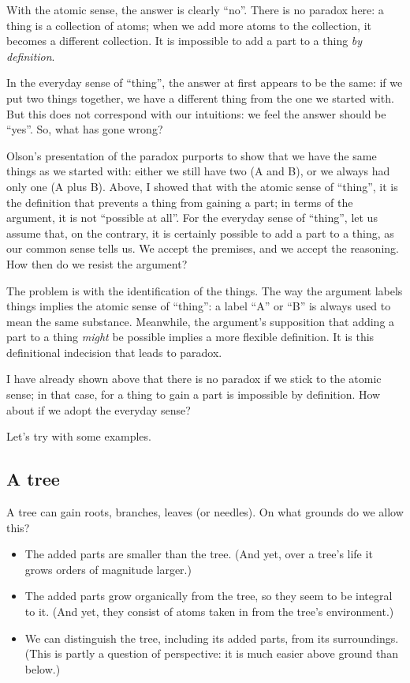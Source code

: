 \documentclass[english,a5paper]{scrartcl}
\begin{document}
With the atomic sense, the answer is clearly “no”. There is no paradox here: a thing is a collection of atoms; when we add more atoms to the collection, it becomes a different collection. It is impossible to add a part to a thing \emph{by definition}.

In the everyday sense of “thing”, the answer at first appears to be the same: if we put two things together, we have a different thing from the one we started with. But this does not correspond with our intuitions: we feel the answer should be “yes”. So, what has gone wrong?

Olson’s presentation of the paradox purports to show that we have the same things as we started with: either we still have two (A and B), or we always had only one (A plus B). Above, I showed that with the atomic sense of “thing”, it is the definition that prevents a thing from gaining a part; in terms of the argument, it is not “possible at all”. For the everyday sense of “thing”, let us assume that, on the contrary, it is certainly possible to add a part to a thing, as our common sense tells us. We accept the premises, and we accept the reasoning. How then do we resist the argument?

The problem is with the identification of the things. The way the argument labels things implies the atomic sense of “thing”: a label “A” or “B” is always used to mean the same substance. Meanwhile, the argument’s supposition that adding a part to a thing \emph{might} be possible implies a more flexible definition. It is this definitional indecision that leads to paradox.

I have already shown above that there is no paradox if we stick to the atomic sense; in that case, for a thing to gain a part is impossible by definition. How about if we adopt the everyday sense?

Let’s try with some examples.

\subsection{A tree}

A tree can gain roots, branches, leaves (or needles). On what grounds do we allow this?

\begin{itemize}
\item The added parts are smaller than the tree. (And yet, over a tree’s life it grows orders of magnitude larger.)
\item The added parts grow organically from the tree, so they seem to be integral to it. (And yet, they consist of atoms taken in from the tree’s environment.)
\item We can distinguish the tree, including its added parts, from its surroundings. (This is partly a question of perspective: it is much easier above ground than below.)
\end{itemize}
\end{document}
